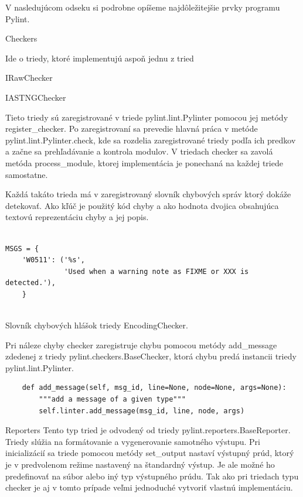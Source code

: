 \documentclass[11pt,oneside,final]{fithesis2}
\begin{document}
		V nasledujúcom odseku si podrobne opíšeme najdôležitejšie prvky programu Pylint.
		
    \begin{list}{•}{}
		\item Checkers 
		
		Ide o triedy, ktoré implementujú aspoň jednu z tried
		
			    \begin{list}{•}{}
					\item IRawChecker
					\item IASTNGChecker
    			\end{list}		
		
		Tieto triedy sú zaregistrované v triede pylint.lint.Pylinter pomocou jej metódy register\_checker.	Po zaregistrovaní sa prevedie hlavná práca v metóde pylint.lint.Pylinter.check, kde sa rozdelia zaregistrované triedy podľa ich predkov a začne sa prehľadávanie a kontrola modulov. V triedach checker sa zavolá metóda process\_module, ktorej implementácia je ponechaná na každej triede samostatne.
		
		Každá takáto trieda má v zaregistrovaný slovník chybových správ ktorý dokáže detekovať. Ako kľúč je použitý kód chyby a ako hodnota dvojica obsahujúca textovú reprezentáciu chyby a jej popis.

\begin{lstlisting}

MSGS = {
    'W0511': ('%s',
              'Used when a warning note as FIXME or XXX is detected.'),
    }
		
\end{lstlisting}		

Slovník chybových hlášok triedy EncodingChecker.


Pri náleze chyby checker zaregistruje chybu pomocou metódy add\_message zdedenej z triedy pylint.checkers.BaseChecker, ktorá chybu predá instancii triedy pylint.lint.Pylinter.

\begin{lstlisting}
    def add_message(self, msg_id, line=None, node=None, args=None):
        """add a message of a given type"""
        self.linter.add_message(msg_id, line, node, args)
\end{lstlisting}

	
		\item Reporters
		Tento typ tried je odvodený od triedy pylint.reporters.BaseReporter. Triedy slúžia na formátovanie a vygenerovanie samotného výstupu. Pri inicializácií sa triede pomocou metódy set\_output nastaví výstupný prúd, ktorý je v predvolenom režime nastavený na štandardný výstup. Je ale možné ho predefinovať na súbor alebo iný typ výstupného prúdu. Tak ako pri triedach typu checker je aj v tomto prípade veľmi jednoduché vytvoriť vlastnú implementáciu.
		

\end{list}
\end{document}
